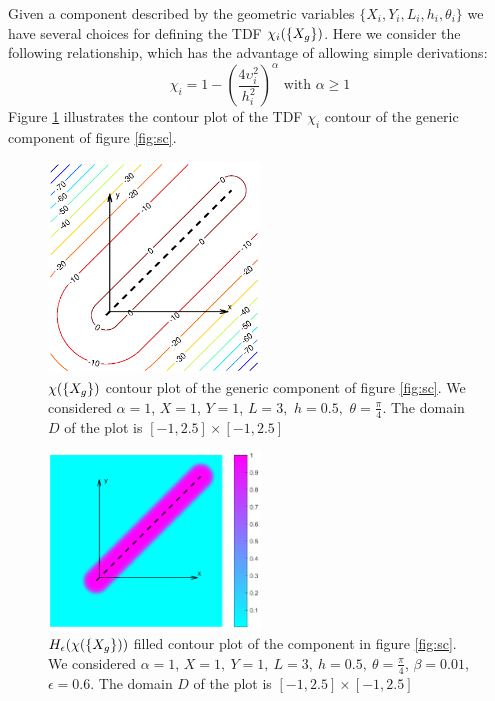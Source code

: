 Given a component described by the geometric variables $\lbrace X_i,Y_i,L_i,h_i,\theta_i\rbrace$ we have several choices for defining the TDF $\chi_i(\left\{{X_g}\right\})$. Here we consider the following relationship, which has the advantage of allowing simple derivations:
\begin{equation}
\label{eq:chi}
    \chi_i=1-\left(\frac{4\upsilon_i^2}{h_i^2}\right)^\alpha \text{ with } \alpha\geq 1 
\end{equation}
Figure \ref{fig:3} illustrates the contour plot of the TDF $\chi_i$ contour of the generic component of figure \ref{fig:sc}.
\begin{figure}[!ht]
\centering
  \includegraphics[width=0.5\textwidth]{images/Ch3/Chi_example.eps}
\caption{$\chi(\left\{{X_g}\right\})$ contour plot of the generic component of figure \ref{fig:sc}. We considered $\alpha=1$, $X=1$, $Y=1$, $L=3,$ $h=0.5,$ $\theta=\frac{\pi}{4}$. The domain $D$ of the plot is $[-1,2.5]\times[-1,2.5]$}
\label{fig:3}       %
\end{figure}
\begin{figure}[!ht]
\centering
  \includegraphics[width=0.5\textwidth]{images/Ch3/H_epsi_bet.eps}
\caption{$H_{\epsilon}(\chi(\left\{{X_g}\right\}))$ filled contour plot of the component in figure \ref{fig:sc}. We considered $\alpha=1$, $X=1,\ Y=1,\ L=3,\ h=0.5,\ \theta=\frac{\pi}{4}$, $\beta=0.01$, $\epsilon=0.6$. The domain $D$ of the plot is $[-1,2.5]\times[-1,2.5]$}
\label{fig:H}       %
\end{figure}

